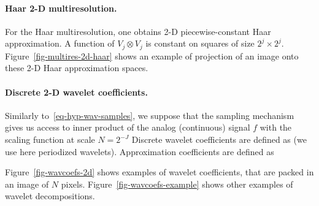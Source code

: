 \paragraph{Haar 2-D multiresolution.}

For the Haar multiresolution, one obtains 2-D piecewise-constant Haar approximation. A function of $V_j \otimes V_j$ is constant on squares of size $2^j \times 2^j$. Figure~\ref{fig-multires-2d-haar} shows an example of projection of an image onto these 2-D Haar approximation spaces. 


\paragraph{Discrete 2-D wavelet coefficients.}

Similarly to~\eqref{eq-hyp-wav-samples}, we suppose that the sampling mechanism gives us access to inner product of the analog (continuous) signal $f$ with the scaling function at scale $N=2^{-J}$
Discrete wavelet coefficients are defined as
(we use here periodized wavelets).
%
Approximation coefficients are defined as


Figure~\ref{fig-wavcoefs-2d} shows examples of wavelet coefficients, that are packed in an image of $N$ pixels.
%
Figure~\ref{fig-wavcoefs-example} shows other examples of wavelet decompositions.


